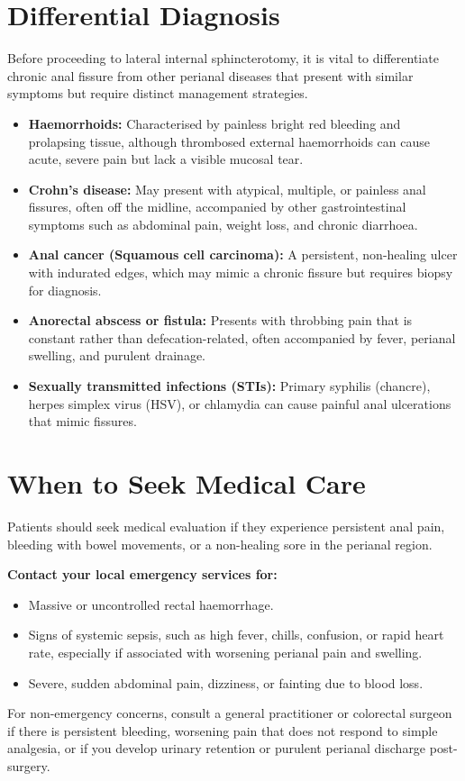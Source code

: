 \section*{Differential Diagnosis}
Before proceeding to lateral internal sphincterotomy, it is vital to differentiate chronic anal fissure from other perianal diseases that present with similar symptoms but require distinct management strategies.
\begin{itemize}
    \item \textbf{Haemorrhoids:} Characterised by painless bright red bleeding and prolapsing tissue, although thrombosed external haemorrhoids can cause acute, severe pain but lack a visible mucosal tear.
    \item \textbf{Crohn's disease:} May present with atypical, multiple, or painless anal fissures, often off the midline, accompanied by other gastrointestinal symptoms such as abdominal pain, weight loss, and chronic diarrhoea.
    \item \textbf{Anal cancer (Squamous cell carcinoma):} A persistent, non-healing ulcer with indurated edges, which may mimic a chronic fissure but requires biopsy for diagnosis.
    \item \textbf{Anorectal abscess or fistula:} Presents with throbbing pain that is constant rather than defecation-related, often accompanied by fever, perianal swelling, and purulent drainage.
    \item \textbf{Sexually transmitted infections (STIs):} Primary syphilis (chancre), herpes simplex virus (HSV), or chlamydia can cause painful anal ulcerations that mimic fissures.
\end{itemize}

\section*{When to Seek Medical Care}
Patients should seek medical evaluation if they experience persistent anal pain, bleeding with bowel movements, or a non-healing sore in the perianal region.

\textbf{Contact your local emergency services for:}
\begin{itemize}
    \item Massive or uncontrolled rectal haemorrhage.
    \item Signs of systemic sepsis, such as high fever, chills, confusion, or rapid heart rate, especially if associated with worsening perianal pain and swelling.
    \item Severe, sudden abdominal pain, dizziness, or fainting due to blood loss.
\end{itemize}
For non-emergency concerns, consult a general practitioner or colorectal surgeon if there is persistent bleeding, worsening pain that does not respond to simple analgesia, or if you develop urinary retention or purulent perianal discharge post-surgery.

